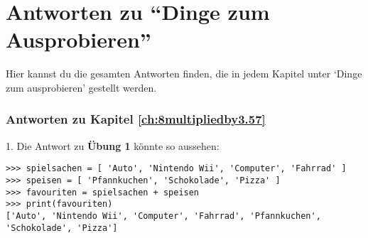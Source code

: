 

\chapter{Antworten zu ``Dinge zum Ausprobieren''}\label{app:answers}

Hier kannst du die gesamten Antworten finden, die in jedem Kapitel unter `Dinge zum ausprobieren' gestellt werden.

\subsection*{Antworten zu Kapitel \ref{ch:8multipliedby3.57}}

1. Die Antwort zu \textbf{Übung 1} könnte so aussehen:

\begin{listing}
\begin{verbatim}
>>> spielsachen = [ 'Auto', 'Nintendo Wii', 'Computer', 'Fahrrad' ]
>>> speisen = [ 'Pfannkuchen', 'Schokolade', 'Pizza' ]
>>> favouriten = spielsachen + speisen
>>> print(favouriten)
['Auto', 'Nintendo Wii', 'Computer', 'Fahrrad', 'Pfannkuchen', 'Schokolade', 'Pizza']
\end{verbatim}
\end{listing}

